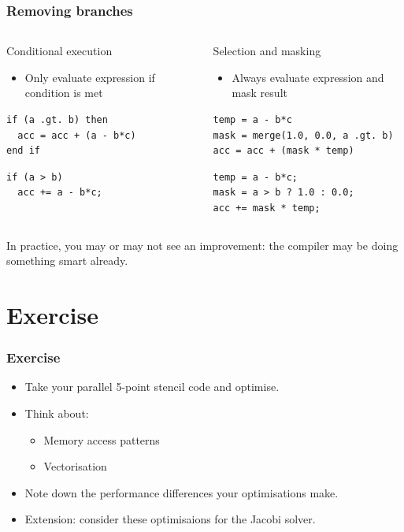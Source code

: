\documentclass{beamer}
\begin{document}
\begin{frame}[fragile]
\frametitle{Removing branches}
\begin{columns}

\begin{column}{0.5\textwidth}
Conditional execution
\begin{itemize}
  \item Only evaluate expression if condition is met
\end{itemize}
\begin{verbatim}
if (a .gt. b) then
  acc = acc + (a - b*c)
end if
\end{verbatim}

\begin{verbatim}
if (a > b)
  acc += a - b*c;
\end{verbatim}
\end{column}

\begin{column}{0.5\textwidth}
Selection and masking
\begin{itemize}
  \item Always evaluate expression and mask result
\end{itemize}
\begin{verbatim}
temp = a - b*c
mask = merge(1.0, 0.0, a .gt. b)
acc = acc + (mask * temp)
\end{verbatim}

\begin{verbatim}
temp = a - b*c;
mask = a > b ? 1.0 : 0.0;
acc += mask * temp;
\end{verbatim}
\end{column}

\end{columns}
In practice, you may or may not see an improvement: the compiler may be doing something smart already.
\end{frame}

\section{Exercise}
\begin{frame}
\frametitle{Exercise}
\begin{itemize}
  \item Take your parallel 5-point stencil code and optimise.
  \item Think about:
    \begin{itemize}
      \item Memory access patterns
      \item Vectorisation
    \end{itemize}
  \item Note down the performance differences your optimisations make.
  \item Extension: consider these optimisaions for the Jacobi solver.
\end{itemize}
\end{frame}
\end{document}
